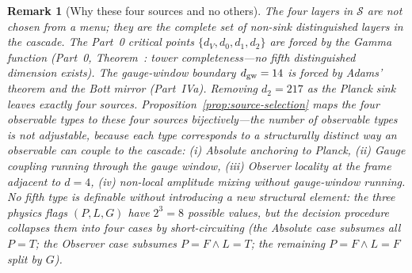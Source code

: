 \documentclass[12pt,a4paper]{article}
\newtheorem*{remark}{Remark}
\begin{document}
\begin{remark}[Why these four sources and no others]
The four layers in $\mathcal{S}$ are not chosen from a menu; they are the complete set of non-sink distinguished layers in the cascade. The Part~0 critical points $\{d_V,d_0,d_1,d_2\}$ are forced by the Gamma function (Part~0, Theorem~: tower completeness---no fifth distinguished dimension exists). The gauge-window boundary $d_{\rm gw}=14$ is forced by Adams' theorem and the Bott mirror (Part~IVa). Removing $d_2=217$ as the Planck sink leaves exactly four sources. Proposition~\ref{prop:source-selection} maps the four observable types to these four sources bijectively---the number of observable types is not adjustable, because each type corresponds to a structurally distinct way an observable can couple to the cascade: (i) Absolute anchoring to Planck, (ii) Gauge coupling running through the gauge window, (iii) Observer locality at the frame adjacent to $d=4$, (iv) non-local amplitude mixing without gauge-window running. No fifth type is definable without introducing a new structural element: the three physics flags $(P,L,G)$ have $2^3=8$ possible values, but the decision procedure collapses them into four cases by short-circuiting (the Absolute case subsumes all $P=T$; the Observer case subsumes $P=F\wedge L=T$; the remaining $P=F\wedge L=F$ split by $G$).
\end{remark}
\end{document}
